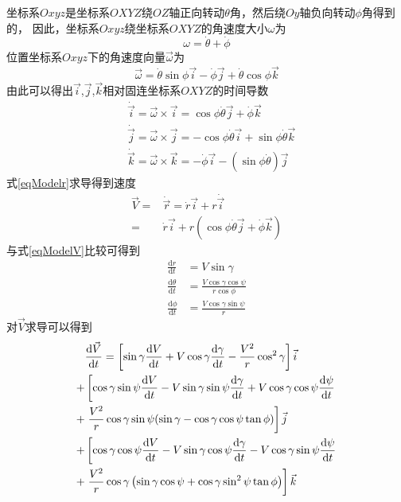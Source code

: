 坐标系$Oxyz$是坐标系$OXYZ$绕$OZ$轴正向转动$\theta$角，然后绕$Oy$轴负向转动$\phi$角得到的，
因此，坐标系$Oxyz$绕坐标系$OXYZ$的角速度大小$\omega$为
\[\omega = \dot{\theta} + \dot{\phi}\]
位置坐标系$Oxyz$下的角速度向量$\vec{\omega}$为
\[\vec{\omega} = \dot{\theta}\sin\phi\vec{i} - \dot{\phi}\vec{j} +\dot{\theta}\cos\phi\vec{k}\]
由此可以得出$\vec{i}$,$\vec{j}$,$\vec{k}$相对固连坐标系$OXYZ$的时间导数
\begin{align*}
    &\dot{\vec{i}} = \vec{\omega}\times\vec{i}
    = \cos\phi\dot{\theta}\vec{j} + \dot{\phi}\vec{k} \\
    &\dot{\vec{j}} = \vec{\omega}\times\vec{j}
    = -\cos\phi\dot{\theta}\vec{i} + \sin\phi\dot{\theta}\vec{k} \\
    &\dot{\vec{k}} = \vec{\omega}\times\vec{k}
    = -\dot{\phi}\vec{i} - (\sin\phi\dot{\theta})\vec{j}
\end{align*}
式\eqref{eqModelr}求导得到速度
\begin{align*}
    \vec{V} =& \dot{\vec{r}} = \dot{r}\vec{i} + r\dot{\vec{i}} \\
    =& \dot{r}\vec{i} + r(\cos\phi\dot{\theta}\vec{j} + \dot{\phi}\vec{k})
\end{align*}
与式\eqref{eqModelV}比较可得到
\begin{align*}
    \frac{\text{d}r}{\text{d}t} &=V\sin\gamma \\
    \frac{\text{d}\theta}{\text{d}t}&=\frac{V\cos\gamma\cos\psi}{r\cos\phi} \\
    \frac{\text{d}\phi}{\text{d}t}&=\frac{V\cos\gamma\sin\psi}{r}
\end{align*}
对$\vec{V}$求导可以得到
\begin{align}
    &\frac{\text{d}\vec{V}}{\text{d}t}
    = \left[\sin\gamma\frac{\text{d}V}{\text{d}t}
    + V\cos\gamma\frac{\text{d}\gamma}{\text{d}t}
    - \frac{V^{2}}{r}\cos^2\gamma\right]\vec{i} \notag\\
    +& \left[\cos\gamma\sin\psi\frac{\text{d}V}{\text{d}t}
    - V\sin\gamma\sin\psi\frac{\text{d}\gamma}{\text{d}t}
    + V\cos\gamma\cos\psi\frac{\text{d}\psi}{\text{d}t}\right. \notag\\
    +& \left.\frac{V^{2}}{r}\cos\gamma\sin\psi(\sin\gamma
    - \cos\gamma\cos\psi\tan\phi)\right]\vec{j} \notag\\
    +& \left[\cos\gamma\cos\psi\frac{\text{d}V}{\text{d}t}
    - V\sin\gamma\cos\psi\frac{\text{d}\gamma}{\text{d}t}
    - V\cos\gamma\sin\psi\frac{\text{d}\psi}{\text{d}t}\right. \notag\\
    +& \left.\frac{V^{2}}{r}\cos\gamma\left(\sin\gamma\cos\psi+\cos\gamma\sin^2\psi\tan\phi\right)\right]\vec{k} \label{eqModelTotal}
\end{align}

